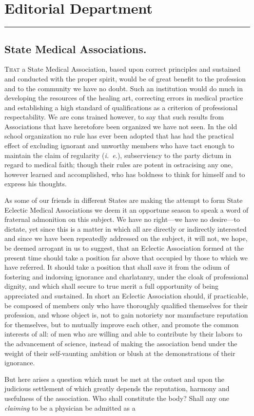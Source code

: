 \chapter*{Editorial Department}

\fancybreak{*}

\section*{State Medical Associations.}

\lettrine[lines=1]{}{That} a State Medical Association, based upon correct principles and
sustained and conducted with the proper spirit, would be of great benefit
to the profession and to the community we have no doubt. Such an
institution would do much in developing the resources of the healing
art, correcting errors in medical practice and establishing a high standard
of qualifications as a criterion of professional respectability. We
are cons trained however, to say that such results from Associations that
have heretofore been organized we have not seen. In the old school
organization no rule has ever been adopted that has had the practical
effect of excluding ignorant and unworthy members who have tact
enough to maintain the claim of regularity (\emph{i.~e.}), subserviency to the
party dictum in regard to medical faith; though their rules are potent
in ostracising any one, however learned and accomplished, who has boldness
to think for himself and to express his thoughts.

As some of our friends in different States are making the attempt to
form State Eclectic Medical Associations we deem it an opportune
season to speak a word of fraternal admonition on this subject. We
have no right---we have no desire---to dictate, yet since this is a matter
in which all are directly or indirectly interested and since we have been
repeatedly addressed on the subject, it will not, we hope, be deemed
arrogant in us to suggest, that an Eclectic Association formed at the
present time should take a position far above that occupied by those
to which we have referred. It should take a position that shall save
it from the odium of fostering and indorsing ignorance and charlatanry,
under the cloak of professional dignity, and which shall secure to true
merit a full opportunity of being appreciated and sustained. In short
an Eclectic Association should, if practicable, be composed of members
only who have thoroughly qualified themselves for their profession, and
whose object is, not to gain notoriety nor manufacture reputation for
themselves, but to mutually improve each other, and promote the common
interests of all: of men who are willing and able to contribute by
their labors to the advancement of science, instead of making the
association bend under the weight of their self-vaunting ambition or
blush at the demonstrations of their ignorance.

But here arises a question which must be met at the outset and
upon the judicious settlement of which greatly depends the reputation,
harmony and usefulness of the association. Who shall constitute the
body?  Shall any one \emph{claiming} to be a physician be admitted as a\endinput
